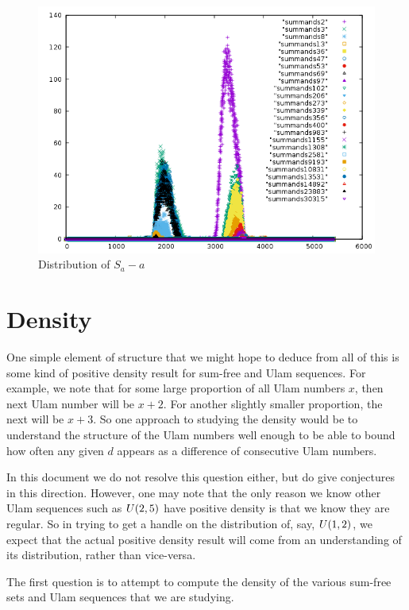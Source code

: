 \documentclass{report}
\theoremstyle{remark}
\numberwithin{equation}{section}
\begin{document}
\begin{figure}
\caption{Distribution of $S_a - a$}\label{fig:complements}
\centering
\includegraphics[scale=0.5]{../figs/shifted_summands_mod_5422.png}
\end{figure}

\section{Density}

One simple element of structure that we might hope to deduce from all
of this is some kind of positive density result for sum-free and Ulam
sequences.  For example, we note that for some large proportion of all
Ulam numbers $x$, then next Ulam number will be $x+2$.  For another
slightly smaller proportion, the next will be $x+3$.  So one approach
to studying the density would be to understand the structure of the
Ulam numbers well enough to be able to bound how often any given $d$
appears as a difference of consecutive Ulam numbers.

In this document we do not resolve this question either, but do give
conjectures in this direction.  However, one may note that the only
reason we know other Ulam sequences such as $U(2,5)$ have
positive density is that we know they are regular.  So in trying to
get a handle on the distribution of, say, $U(1,2)$, we expect
that the actual positive density result will come from an
understanding of its distribution, rather than vice-versa.

The first question is to attempt to compute the density of the various
sum-free sets and Ulam sequences that we are studying.  
\end{document}
